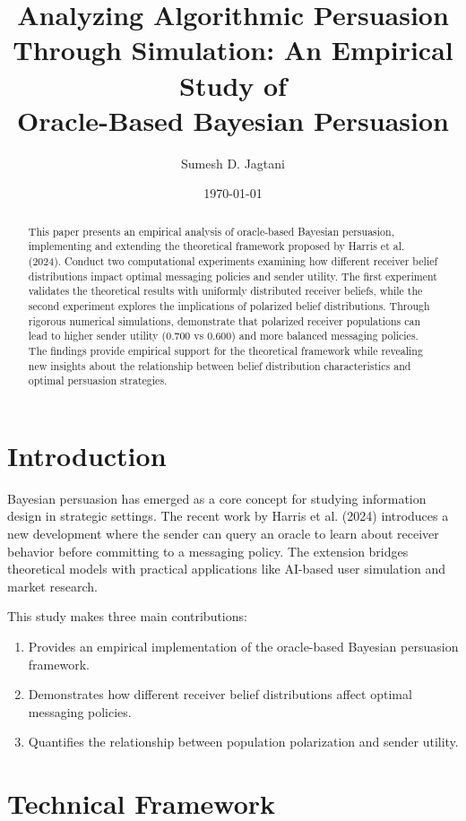 \documentclass[12pt]{article}
\title{Analyzing Algorithmic Persuasion Through Simulation: An Empirical Study of\\
Oracle-Based Bayesian Persuasion}
\author{Sumesh D. Jagtani}
\date{\today}
\theoremstyle{plain}
\theoremstyle{definition}
\theoremstyle{remark}
\begin{document}
\maketitle

\begin{abstract}
This paper presents an empirical analysis of oracle-based Bayesian persuasion, implementing and extending the theoretical framework proposed by Harris et al. (2024). Conduct two computational experiments examining how different receiver belief distributions impact optimal messaging policies and sender utility. The first experiment validates the theoretical results with uniformly distributed receiver beliefs, while the second experiment explores the implications of polarized belief distributions. Through rigorous numerical simulations, demonstrate that polarized receiver populations can lead to higher sender utility (0.700 vs 0.600) and more balanced messaging policies. The findings provide empirical support for the theoretical framework while revealing new insights about the relationship between belief distribution characteristics and optimal persuasion strategies.
\end{abstract}

\section{Introduction}
Bayesian persuasion has emerged as a core concept for studying information design in strategic settings. The recent work by Harris et al. (2024) introduces a new development where the sender can query an oracle to learn about receiver behavior before committing to a messaging policy. The extension bridges theoretical models with practical applications like AI-based user simulation and market research.

This study makes three main contributions:
\begin{enumerate}
    \item Provides an empirical implementation of the oracle-based Bayesian persuasion framework.
    \item Demonstrates how different receiver belief distributions affect optimal messaging policies.
    \item Quantifies the relationship between population polarization and sender utility.
\end{enumerate}

\section{Technical Framework}
\end{document}
